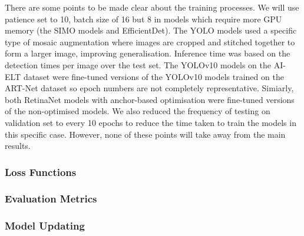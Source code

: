 There are some points to be made clear about the training processes. We will use patience set to 10, batch size of 16 but 8 in models which require more GPU memory (the SIMO models and EfficientDet). The YOLO models used a specific type of mosaic augmentation where images are cropped and stitched together to form a larger image, improving generalisation. Inference time was based on the detection times per image over the test set. The YOLOv10 models on the AI-ELT dataset were fine-tuned versions of the YOLOv10 models trained on the ART-Net dataset so epoch numbers are not completely representative. Simiarly, both RetinaNet models with anchor-based optimisation were fine-tuned versions of the non-optimised models. We also reduced the frequency of testing on validation set to every 10 epochs to reduce the time taken to train the models in this specific case. However, none of these points will take away from the main results.




\subsubsection{Loss Functions}




\subsubsection{Evaluation Metrics}



\subsubsection{Model Updating}

